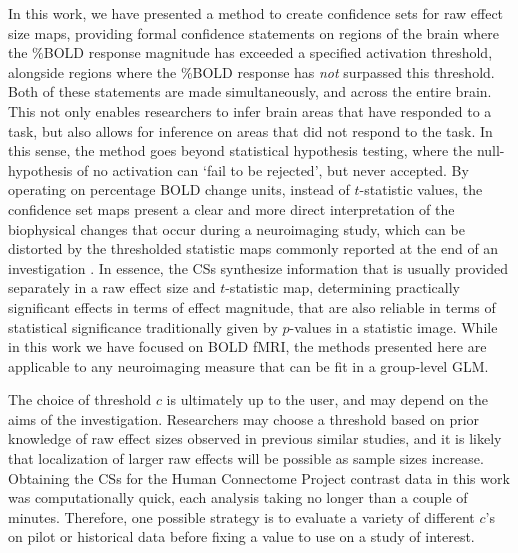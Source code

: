 In this work, we have presented a method to create confidence sets for raw effect size maps, providing formal confidence statements on regions of the brain where the \%BOLD response magnitude has exceeded a specified activation threshold, alongside regions where the \%BOLD response has \textit{not} surpassed this threshold. Both of these statements are made simultaneously, and across the entire brain. This not only enables researchers to infer brain areas that have responded to a task, but also allows for inference on areas that did not respond to the task. In this sense, the method goes beyond statistical hypothesis testing, where the null-hypothesis of no activation can `fail to be rejected', but never accepted. By operating on percentage BOLD change units, instead of $t$-statistic values, the confidence set maps present a clear and more direct interpretation of the biophysical changes that occur during a neuroimaging study, which can be distorted by the thresholded statistic maps commonly reported at the end of an investigation \citep{Engel2013-nq}. In essence, the CSs synthesize information that is usually provided separately in a raw effect size and $t$-statistic map, determining practically significant effects in terms of effect magnitude, that are also reliable in terms of statistical significance traditionally given by $p$-values in a statistic image. While in this work we have focused on BOLD fMRI, the methods presented here are applicable to any neuroimaging measure that can be fit in a group-level GLM.

The choice of threshold $c$ is ultimately up to the user, and may depend on the aims of the investigation. Researchers may choose a threshold based on prior knowledge of raw effect sizes observed in previous similar studies, and it is likely that localization of larger raw effects will be possible as sample sizes increase. Obtaining the CSs for the Human Connectome Project contrast data in this work was computationally quick, each analysis taking no longer than a couple of minutes. Therefore, one possible strategy is to evaluate a variety of different $c$'s on pilot or historical data before fixing a value to use on a study of interest.

